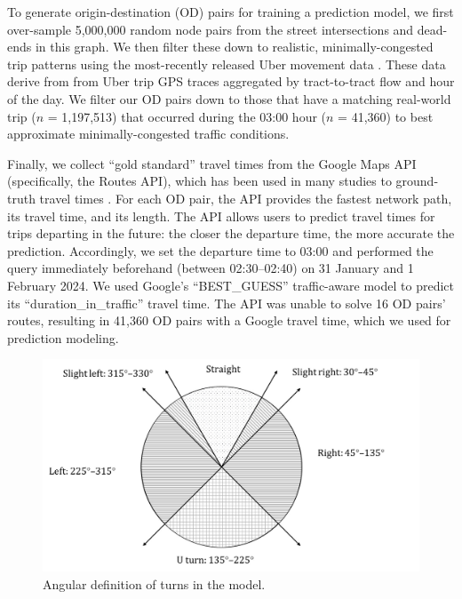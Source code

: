 \documentclass[12pt,letterpaper]{article} %
\begin{document}
    To generate origin-destination (OD) pairs for training a prediction model, we first over-sample 5,000,000 random node pairs from the street intersections and dead-ends in this graph. We then filter these down to realistic, minimally-congested trip patterns using the most-recently released Uber movement data \citep{ubermovement2020}. These data derive from from Uber trip GPS traces aggregated by tract-to-tract flow and hour of the day. We filter our OD pairs down to those that have a matching real-world trip ($n$ = 1,197,513) that occurred during the 03:00 hour ($n$ = 41,360) to best approximate minimally-congested traffic conditions.

    Finally, we collect \enquote{gold standard} travel times from the Google Maps API (specifically, the Routes API), which has been used in many studies to ground-truth travel times  \citep[e.g.,][]{ludwig2023traffic, hu2020estimating, wang2011estimating, fu2023comparative, delmelle2019travel}. For each OD pair, the API provides the fastest network path, its travel time, and its length. The API allows users to predict travel times for trips departing in the future: the closer the departure time, the more accurate the prediction. Accordingly, we set the departure time to 03:00 and performed the query immediately beforehand (between 02:30--02:40) on 31 January and 1 February 2024. We used Google's \enquote{BEST\_GUESS} traffic-aware model to predict its \enquote{duration\_in\_traffic} travel time. The API was unable to solve 16 OD pairs' routes, resulting in 41,360 OD pairs with a Google travel time, which we used for prediction modeling.

    \begin{figure}[hbt!]
        \centering
        \includegraphics[width=1.0\textwidth]{fig_turns_definition.jpg}
        \caption{Angular definition of turns in the model.}\label{fig:turns_definition}
    \end{figure}
\end{document}
